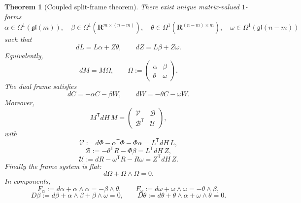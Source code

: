 \documentclass[11pt,a4paper]{article}
\numberwithin{equation}{section}
\newcommand{\R}{\mathbf R}
\theoremstyle{thmcompact}
\newtheorem{theorem}{Theorem}[section]
\theoremstyle{remark}
\begin{document}
\begin{theorem}[Coupled split-frame theorem]
\label{thm:split-frame}
There exist unique matrix-valued $1$-forms
\[
\alpha\in\Omega^1(\mathfrak{gl}(m)),
\quad
\beta\in\Omega^1(\R^{m\times(n-m)}),
\quad
\theta\in\Omega^1(\R^{(n-m)\times m}),
\quad
\omega\in\Omega^1(\mathfrak{gl}(n-m))
\]
such that
\begin{equation}
dL=L\alpha+Z\theta,
\qquad
dZ=L\beta+Z\omega.
\label{eq:split-frame-derivatives}
\end{equation}
Equivalently,
\begin{equation}
dM=M\Omega,
\qquad
\Omega:=
\begin{pmatrix}
\alpha & \beta\\
\theta & \omega
\end{pmatrix}.
\label{eq:Omega-def}
\end{equation}
The dual frame satisfies
\begin{equation}
dC=-\alpha C-\beta W,
\qquad
dW=-\theta C-\omega W.
\label{eq:dual-frame-derivatives}
\end{equation}
Moreover,
\begin{equation}
M^{\mathsf T}dH\,M=
\begin{pmatrix}
\mathcal V & \mathcal B\\
\mathcal B^{\mathsf T} & \mathcal U
\end{pmatrix},
\label{eq:metric-structure}
\end{equation}
with
\begin{equation}
\mathcal V:=d\Phi-\alpha^{\mathsf T}\Phi-\Phi\alpha=L^{\mathsf T}dH\,L,
\label{eq:V-callig}
\end{equation}
\begin{equation}
\mathcal B:=-\theta^{\mathsf T}R-\Phi\beta=L^{\mathsf T}dH\,Z,
\label{eq:B-callig}
\end{equation}
\begin{equation}
\mathcal U:=dR-\omega^{\mathsf T}R-R\omega=Z^{\mathsf T}dH\,Z.
\label{eq:U-callig}
\end{equation}
Finally the frame system is flat:
\begin{equation}
d\Omega+\Omega\wedge\Omega=0.
\label{eq:flat-Cartan}
\end{equation}
In components,
\begin{equation}
F_\alpha:=d\alpha+\alpha\wedge\alpha=-\beta\wedge\theta,
\qquad
F_\omega:=d\omega+\omega\wedge\omega=-\theta\wedge\beta,
\label{eq:curvature-pair}
\end{equation}
\begin{equation}
D\beta:=d\beta+\alpha\wedge\beta+\beta\wedge\omega=0,
\qquad
D\theta:=d\theta+\theta\wedge\alpha+\omega\wedge\theta=0.
\label{eq:Codazzi-pair}
\end{equation}
\end{theorem}
\end{document}
